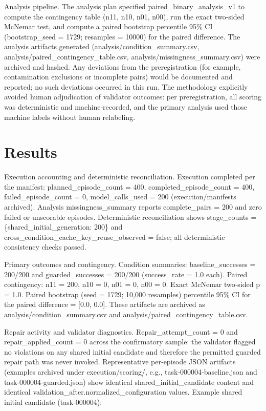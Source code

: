 \documentclass[conference]{IEEEtran}
\begin{document}
Analysis pipeline. The analysis plan specified paired\_binary\_analysis\_v1 to compute the contingency table (n11, n10, n01, n00), run the exact two‑sided McNemar test, and compute a paired bootstrap percentile 95\% CI (bootstrap\_seed = 1729; resamples = 10000) for the paired difference. The analysis artifacts generated (analysis/condition\_summary.csv, analysis/paired\_contingency\_table.csv, analysis/missingness\_summary.csv) were archived and hashed. Any deviations from the preregistration (for example, contamination exclusions or incomplete pairs) would be documented and reported; no such deviations occurred in this run. The methodology explicitly avoided human adjudication of validator outcomes: per preregistration, all scoring was deterministic and machine‑recorded, and the primary analysis used those machine labels without human relabeling.

\section{Results}
Execution accounting and deterministic reconciliation. Execution completed per the manifest: planned\_episode\_count = 400, completed\_episode\_count = 400, failed\_episode\_count = 0, model\_calls\_used = 200 (execution/manifests archived). Analysis missingness\_summary reports complete\_pairs = 200 and zero failed or unscorable episodes. Deterministic reconciliation shows stage\_counts = \{shared\_initial\_generation: 200\} and cross\_condition\_cache\_key\_reuse\_observed = false; all deterministic consistency checks passed.

Primary outcomes and contingency. Condition summaries: baseline\_successes = 200/200 and guarded\_successes = 200/200 (success\_rate = 1.0 each). Paired contingency: n11 = 200, n10 = 0, n01 = 0, n00 = 0. Exact McNemar two‑sided p = 1.0. Paired bootstrap (seed = 1729; 10,000 resamples) percentile 95\% CI for the paired difference = [0.0, 0.0]. These artifacts are archived as analysis/condition\_summary.csv and analysis/paired\_contingency\_table.csv.

Repair activity and validator diagnostics. Repair\_attempt\_count = 0 and repair\_applied\_count = 0 across the confirmatory sample: the validator flagged no violations on any shared initial candidate and therefore the permitted guarded repair path was never invoked. Representative per‑episode JSON artifacts (examples archived under execution/scoring/, e.g., task‑000004‑baseline.json and task‑000004‑guarded.json) show identical shared\_initial\_candidate content and identical validation\_after.normalized\_configuration values. Example shared initial candidate (task‑000004):
\end{document}
